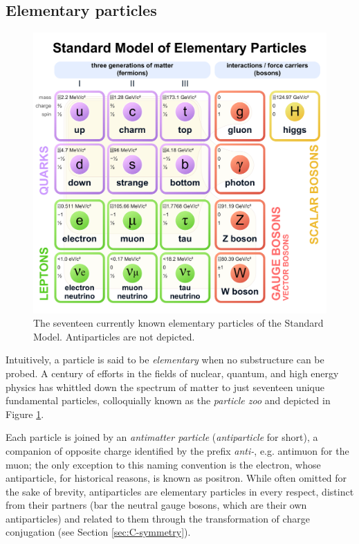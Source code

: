 \subsection{Elementary particles}
\begin{figure}[t!]
	\centering
	\includegraphics[scale=0.15]{graphics/01-standard_model/Standard_Model_of_Elementary_Particles.pdf}
	\caption[Currently known Standard Model elementary particles.]{The seventeen currently known elementary particles of the Standard Model. Antiparticles are not depicted.}
	\label{fig:particle_zoo}
\end{figure}

Intuitively, a particle is said to be \textit{elementary} when no substructure can be probed. 
A century of efforts in the fields of nuclear, quantum, and high energy physics has whittled down the spectrum of matter to just seventeen unique fundamental particles, colloquially known as the \textit{particle zoo} and depicted in Figure \ref{fig:particle_zoo}.

Each particle is joined by an \textit{antimatter particle} (\textit{antiparticle} for short), a companion of opposite charge identified by the prefix \textit{anti-}, e.g. antimuon for the muon; the only exception to this naming convention is the electron, whose antiparticle, for historical reasons, is known as positron.
While often omitted for the sake of brevity, antiparticles are elementary particles in every respect, distinct from their partners (bar the neutral gauge bosons, which are their own antiparticles) and related to them through the transformation of charge conjugation (see Section \ref{sec:C-symmetry}).

